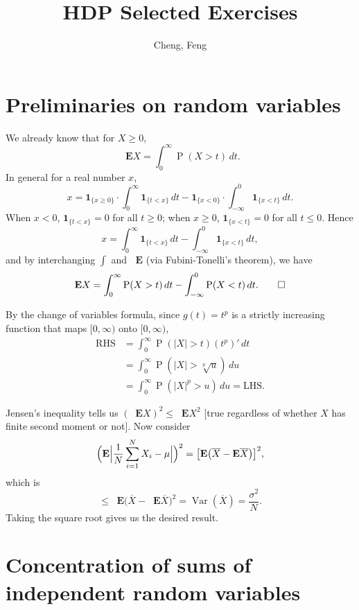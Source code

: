 \documentclass[11pt]{article}
\title{HDP Selected Exercises}
\author{Cheng, Feng}
\date{}
\newcommand{\abs}[1]{\lvert #1 \rvert}
\newcommand{\ol}[1]{\overline{#1}}
\renewcommand{\Pr}{\operatorname{P}}
\newcommand{\E}{\mathop{}\!\mathbf{E}}
\newcommand{\I}[1]{\mathbf{1}_{\{#1\}}}
\newcommand{\Var}{\operatorname{Var}}
\theoremstyle{plain}
\theoremstyle{definition}
\theoremstyle{remark}
\theoremstyle{definition}
\newenvironment{mansol}[1]{%
  \renewcommand\themansolinner{#1}%
  \mansolinner
}{\endmansolinner}
\begin{document}
\maketitle

\section{Preliminaries on random variables}
\begin{mansol}{1.2.2}
    We already know that for $X \geq 0$, \[\E X = \int_{0}^\infty \Pr(X > t) \, dt.\] In general for a real number $x$, \[
    x = \I{x \geq 0} \cdot \int_0^\infty \I{t < x} \,dt - \I{x < 0} \cdot \int_{-\infty}^0 \I{x < t} \,dt.
\]
When $x<0$, $\I{t<x} = 0$ for all $t\geq 0$; when $x \geq 0$, $\I{x<t} = 0$ for all $t \leq 0$. Hence \[x = \int_0^\infty \I{t < x} \,dt - \int_{-\infty}^0 \I{x < t} \,dt,
\]
and by interchanging $\int$ and $\E$ (via Fubini-Tonelli's theorem), we have \[ \E X = \int_{0}^\infty \Pr(X > t) \, dt - \int_{-\infty}^0 \Pr(X < t) \,dt. \qedhere\]
\end{mansol}

\begin{mansol}{1.2.3}
By the change of variables formula, since $g(t) = t^p$ is a strictly increasing function that maps $[0,\infty)$ onto $[0,\infty)$,
\begin{align*}
\text{RHS} & = \int_0^\infty \Pr(\abs X  > t) (t^p)'\,dt \\
& = \int_0^\infty \Pr(\abs X > \sqrt[p]{u})\,du \\ & = \int_0^\infty \Pr(\abs X ^p > u) \,du = \text{LHS}.
\end{align*}
\end{mansol}

\begin{mansol}{1.3.3}
Jensen's inequality tells us $(\E X)^2 \leq \E X^2$ [true regardless of whether $X$ has finite second moment or not]. Now consider \[
\Bigl(\E \Big\lvert\frac{1}{N} \sum_{i=1}^N X_i - \mu\Big\rvert \Bigr)^2 = \bigl[\E\bigl(\ol{X} - \E\ol{X}\bigr)\bigr]^2,
\] which is
\[
\leq \E \bigl(\ol X - \E \ol X \bigr)^2 = \Var(\ol X) = \frac{\sigma^2}{N}.
\]
Taking the square root gives us the desired result.
\end{mansol}

\section{Concentration of sums of independent random variables}
\end{document}
